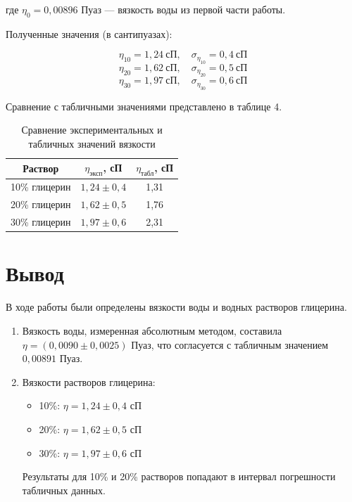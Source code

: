 \documentclass[a4paper]{article}
\begin{document}
\begin{enumerate}
    где $\eta_0 = 0,00896$ Пуаз — вязкость воды из первой части работы.

    Полученные значения (в сантипуазах):
    
    $$\eta_{10} = 1,24\ \text{сП}, \quad \sigma_{\eta_{10}} = 0,4\ \text{сП}$$
    $$\eta_{20} = 1,62\ \text{сП}, \quad \sigma_{\eta_{20}} = 0,5\ \text{сП}$$
    $$\eta_{30} = 1,97\ \text{сП}, \quad \sigma_{\eta_{30}} = 0,6\ \text{сП}$$

    Сравнение с табличными значениями представлено в таблице 4.

    \begin{table}[h]
        \centering
        \caption{Сравнение экспериментальных и табличных значений вязкости}
        \label{tab:compare}
        \begin{tabular}{|c|c|c|}
        \hline
        Раствор & $\eta_{\text{эксп}}$, сП & $\eta_{\text{табл}}$, сП \\
        \hline
        10\% глицерин & $1,24 \pm 0,4$ & 1,31 \\
        20\% глицерин & $1,62 \pm 0,5$ & 1,76 \\
        30\% глицерин & $1,97 \pm 0,6$ & 2,31 \\
        \hline
        \end{tabular}
    \end{table}
\end{enumerate}

\section{Вывод}
В ходе работы были определены вязкости воды и водных растворов глицерина.
\begin{enumerate}
    \item Вязкость воды, измеренная абсолютным методом, составила $\eta = (0,0090 \pm 0,0025)$ Пуаз, что согласуется с табличным значением $0,00891$ Пуаз.
    \item Вязкости растворов глицерина:
    \begin{itemize}
        \item 10\%: $\eta = 1,24 \pm 0,4$ сП
        \item 20\%: $\eta = 1,62 \pm 0,5$ сП
        \item 30\%: $\eta = 1,97 \pm 0,6$ сП
    \end{itemize}
    Результаты для 10\% и 20\% растворов попадают в интервал погрешности табличных данных.
\end{enumerate}
\end{document}
